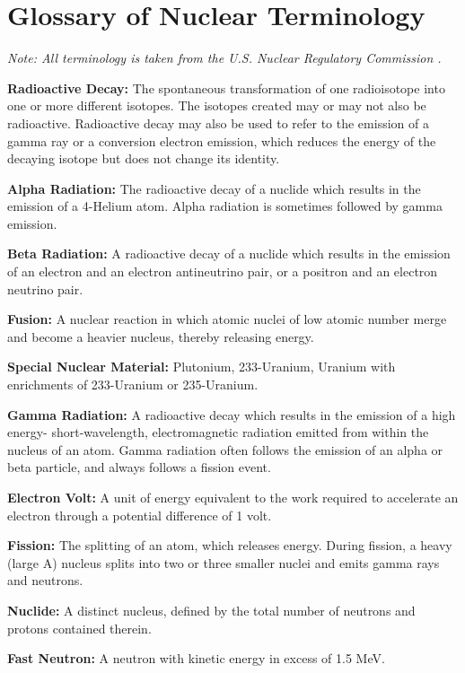 \documentclass{report}
\begin{document}
\appendix
\chapter[Appendix A: Glossary of Nuclear Terminology]{Glossary of Nuclear Terminology}  \label{app:glossary}



\textit{Note: All terminology is taken from the U.S. Nuclear Regulatory Commission  \cite{USNRC2015}.}

\textbf{Radioactive Decay:} The spontaneous transformation of one radioisotope into one or more different isotopes. The isotopes created may or may not also be radioactive. Radioactive decay may also be used to refer to the emission of a gamma ray or a conversion electron emission, which reduces the energy of the decaying isotope but does not change its identity. 

\textbf{Alpha Radiation:} The radioactive decay of a nuclide which results in the emission of a 4-Helium atom. Alpha radiation is sometimes followed by gamma emission. 

\textbf{Beta Radiation:} A radioactive decay of a nuclide which results in the emission of an electron and an electron antineutrino pair, or a positron and an electron neutrino pair. 

\textbf{Fusion:} A nuclear reaction in which atomic nuclei of low atomic number merge and become a heavier nucleus, thereby releasing energy. 

\textbf{Special Nuclear Material:} Plutonium, 233-Uranium, Uranium with enrichments of 233-Uranium or 235-Uranium.

\textbf{Gamma Radiation:} A radioactive decay which results in the emission of a high energy- short-wavelength, electromagnetic radiation emitted from within the nucleus of an atom. Gamma radiation often follows the emission of an alpha or beta particle, and always follows a fission event. 

\textbf{Electron Volt:} A unit of energy equivalent to the work required to accelerate an electron through a potential difference of 1 volt. 

\textbf{Fission:} The splitting of an atom, which releases energy. During fission, a heavy (large A) nucleus splits into two or three smaller nuclei and emits gamma rays and neutrons. 

\textbf{Nuclide:} A distinct nucleus, defined by the total number of neutrons and protons contained therein.  

\textbf{Fast Neutron:} A neutron with kinetic energy in excess of 1.5 MeV.
\end{document}
